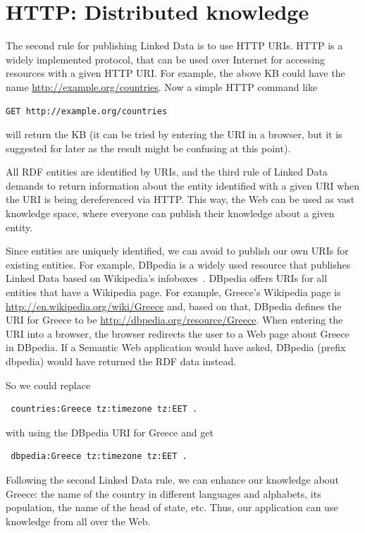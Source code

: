 \section{HTTP: Distributed knowledge}
\label{http}

The second rule for publishing Linked Data is to use HTTP URIs.
HTTP is a widely implemented protocol, that can be used over Internet for accessing resources with a given HTTP URI.
For example, the above \ac{KB} could have the name \url{http://example.org/countries}.
Now a simple HTTP command like 
\begin{verbatim}
GET http://example.org/countries
\end{verbatim}
will return the \ac{KB} (it can be tried by entering the URI in a browser, but it is suggested for later as the result might be confusing at this point).

All \ac{RDF} entities are identified by URIs, and the third rule of Linked Data demands to return information about the entity identified with a given URI when the URI is being dereferenced via HTTP.
This way, the Web can be used as vast knowledge space, where everyone can publish their knowledge about a given entity.

Since entities are uniquely identified, we can avoid to publish our own URIs for existing entities.
For example, DBpedia is a widely used resource that publishes Linked Data based on Wikipedia's infoboxes~\cite{dbpedia-swj}.
DBpedia offers URIs for all entities that have a Wikipedia page.
For example, Greece's Wikipedia page is \url{http://en.wikipedia.org/wiki/Greece} and, based on that, DBpedia defines the URI for Greece to be \url{http://dbpedia.org/resource/Greece}.
When entering the URI into a browser, the browser redirects the user to a Web page about Greece in DBpedia.
If a Semantic Web application would have asked, DBpedia (prefix dbpedia) would have returned the \ac{RDF} data instead.

So we could replace

\begin{verbatim}
 countries:Greece tz:timezone tz:EET .
\end{verbatim}

with using the DBpedia URI for Greece and get

\begin{verbatim}
 dbpedia:Greece tz:timezone tz:EET .
\end{verbatim}

Following the second Linked Data rule, we can enhance our knowledge about Greece: the name of the country in different languages and alphabets, its population, the name of the head of state, etc.
Thus, our application can use knowledge from all over the Web.

